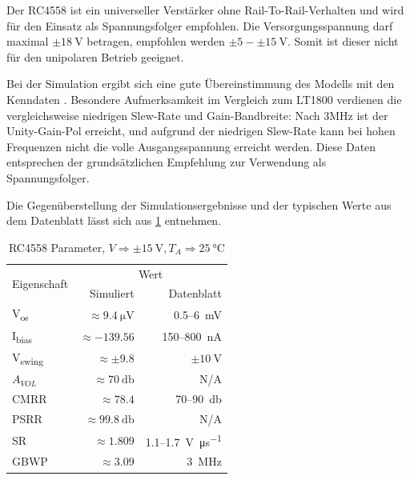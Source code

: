\documentclass[
	ngerman,
	parskip=half,
	twocolumn,
	DIV=calc,
	]{scrartcl}
\begin{document}
		Der RC4558 ist ein universeller Verstärker ohne Rail-To-Rail-Verhalten und wird für den Einsatz als Spannungsfolger empfohlen. 
		Die Versorgungsspannung darf maximal $ \pm\SI{18}{\volt} $ betragen, empfohlen werden $ \pm5-\pm\SI{15}{\volt}$. Somit ist dieser nicht für den unipolaren Betrieb geeignet.
		
		Bei der Simulation ergibt sich eine gute Übereinstimmung des Modells mit den Kenndaten \cite{datasheet:RC4558}. Besondere Aufmerksamkeit im Vergleich zum LT1800 verdienen die vergleichsweise niedrigen Slew-Rate und Gain-Bandbreite: Nach 3MHz ist der Unity-Gain-Pol erreicht, und aufgrund der niedrigen Slew-Rate kann bei hohen Frequenzen nicht die volle Ausgangsspannung erreicht werden. Diese Daten entsprechen der grundsätzlichen Empfehlung zur Verwendung als Spannungsfolger. 
		
		Die Gegenüberstellung der Simulationsergebnisse und der typischen Werte aus dem Datenblatt \cite{datasheet:RC4558} lässt sich aus \cref{tab:opamp-RC4558} entnehmen. 
	
		\begin{table}[h!]
			\centering
			\begin{tabular}{l r r}
				\toprule				
				\multirow{2}{*}{Eigenschaft} &
					\multicolumn{2}{c}{Wert} \\
					& Simuliert & Datenblatt \cite{datasheet:RC4558} \\
				\midrule
				
				V\textsubscript{os} 											& $ \approx \SI{9.4}{\micro\volt}  $ &  0.5--\SI{6}{\milli\volt}  \\			
				I\textsubscript{bias} 											 & $ \approx-139.56$ 		& 150--\SI{800}{\nano\ampere}  \\			
				V\textsubscript{swing} 										  & $ \approx\pm9.8$ 		 & $ \pm \SI{10}{\volt} $ \\
				 $A_{VOL}$														   & $\approx \SI{70}{\decibel}$ 		   & N/A \\
				CMRR 																  & $\approx78.4$ 		      & 70--\SI{90}{\decibel}\\
				PSRR  																   & $\approx \SI{99.8}{\decibel}$ 		   & N/A \\
				SR 																		 & $ \approx 1.809$ 		 & 1.1--\SI{1.7}{\volt\per\micro\second}\\
				GBWP 															     & $\approx 3.09$ 			  & \SI{3}{\mega\hertz}\\
				\bottomrule
			\end{tabular}
			\caption[RC4558 Parameter]{RC4558 Parameter, $V \Rightarrow \pm \SI{15}{\volt}, T_A \Rightarrow  \SI{25}{\celsius}  $}
			\label{tab:opamp-RC4558}
		\end{table}
	
\end{document}
